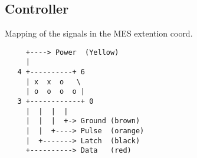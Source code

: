 \subsection{Controller}

Mapping of the signals in the MES extention coord.

\begin{verbatim}
     +----> Power  (Yellow)
     |
   4 +----------+ 6
     | x  x  o   \
     | o  o  o  o |
   3 +------------+ 0
     |  |  |  |
     |  |  |  +-> Ground (brown)
     |  |  +----> Pulse  (orange)
     |  +-------> Latch  (black)
     +----------> Data   (red)
\end{verbatim}
